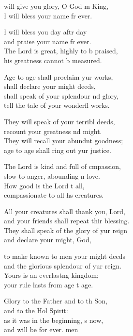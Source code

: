 \settowidth{\versewidth}{All your creatures shall thank you, O Lord, *}
\begin{psalmverse}%
  \begin{patverse}
 will give you glory, O God m King, \Med\\
I will bless your name fr ever.

I will bless you day aftr day\Med\\
and praise your name fr ever.\\
The Lord is great, highly to b praised,\Med\\
his greatness cannot b measured.

Age to age shall proclaim yur works,\Med\\
shall declare your might deeds,\\
shall speak of your splendour nd glory,\Med\\
tell the tale of your wonderfl works.

They will speak of your terribl deeds,\Med\\
recount your greatness nd might.\\
They will recall your abundnt goodness;\Med\\
age to age shall ring out yur justice.

The Lord is kind and full of cmpassion,\Med\\
slow to anger, abounding \pointup{\i}n love.\\
How good is the Lord t all,\Med\\
compassionate to all h\pointup{\i}s creatures.

All your creatures shall thank you,  Lord,\Med\\
and your friends shall repeat thir blessing.\\
They shall speak of the glory of yur reign\Med\\
and declare your might,  God,

to make known to men your might deeds\Med\\
and the glorious splendour of yur reign.\\
Yours is an everlast\pointup{\i}ng kingdom;\Med\\
your rule lasts from age t age.

Glory to the Father and to th Son,\Med\\
and to the Hol Spirit:\\
as it was in the beginning, \pointup{\i}s now,\Med\\
and will be for ever. men
  \end{patverse}
\end{psalmverse}
